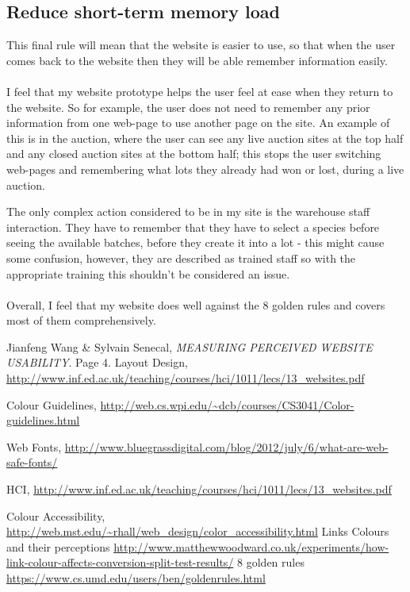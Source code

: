 \documentclass{article}
\begin{document}
\subsection{Reduce short-term memory load}
This final rule will mean that the website is easier to use, so that when the user comes back to the website then they will be able remember information easily. 
\\ \\ 
I feel that my website prototype helps the user feel at ease when they return to the website. So for example, the user does not need to remember any prior information from one web-page to use another page on the site. An example of this is in the auction, where the user can see any live auction sites at the top half and any closed auction sites at the bottom half; this stops the user switching web-pages and remembering what lots they already had won or lost, during a live auction. 

The only complex action considered to be in my site is the warehouse staff interaction. They have to remember that they have to select a species before seeing the available batches, before they create it into a lot - this might cause some confusion, however, they are described as trained staff so with the appropriate training this shouldn't be considered an issue. 
\\ \\ 
Overall, I feel that my website does well against the 8 golden rules and covers most of them comprehensively.
\begin{thebibliography}{9}
 Jianfeng Wang \& Sylvain Senecal,
  \emph{MEASURING PERCEIVED WEBSITE USABILITY}.
  Page 4.
Layout Design,
\url{http://www.inf.ed.ac.uk/teaching/courses/hci/1011/lecs/13_websites.pdf}

Colour Guidelines, 
\url{http://web.cs.wpi.edu/~dcb/courses/CS3041/Color-guidelines.html}

Web Fonts, 
\url{http://www.bluegrassdigital.com/blog/2012/july/6/what-are-web-safe-fonts/}

HCI, 
\url{http://www.inf.ed.ac.uk/teaching/courses/hci/1011/lecs/13_websites.pdf}

Colour Accessibility, 
\url{http://web.mst.edu/~rhall/web_design/color_accessibility.html}
Links Colours and their perceptions
\url{http://www.matthewwoodward.co.uk/experiments/how-link-colour-affects-conversion-split-test-results/}
8 golden rules 
\url{https://www.cs.umd.edu/users/ben/goldenrules.html}
\end{thebibliography}
\end{document}
